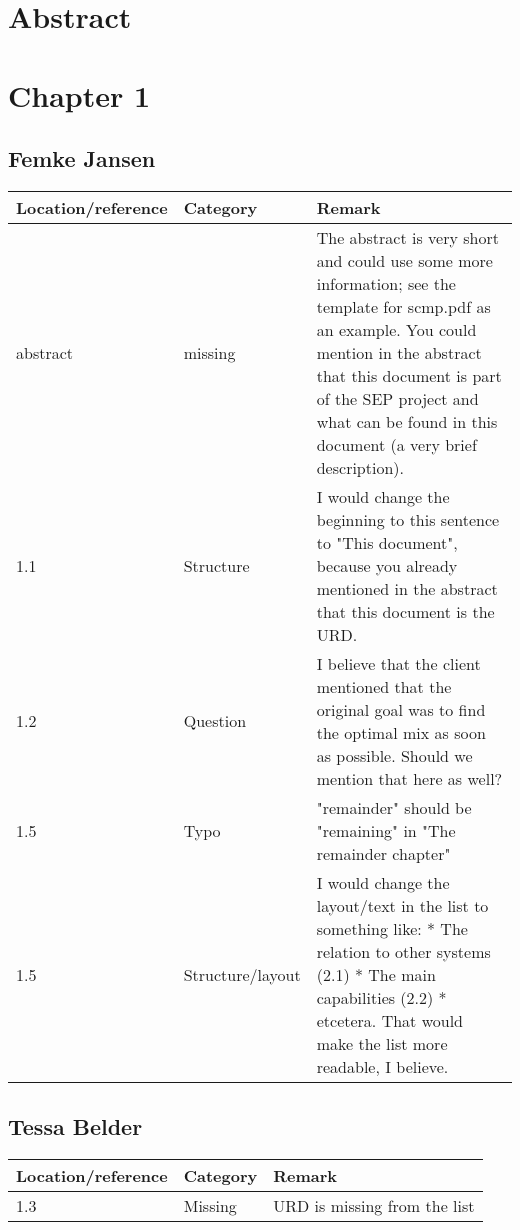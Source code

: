 
\section{Abstract}


\section{Chapter 1}

\subsection*{Femke Jansen}

\begin{tabular}{l|l|p{}}
Location/reference & Category & Remark\\
\hline
\hline
abstract & missing & The abstract is very short and could use some more information; see the template for scmp.pdf as an example. You could mention in the abstract that this document is part of the SEP project and what can be found in this document (a very brief description). \vspace{1em} \\
1.1 & Structure & I would change the beginning to this sentence to "This document", because you already mentioned in the abstract that this document is the URD.\vspace{1em} \\
1.2 & Question & I believe that the client mentioned that the original goal was to find the optimal mix as soon as possible. Should we mention that here as well? \vspace{1em} \\
1.5 & Typo & "remainder" should be "remaining" in "The remainder chapter"\\ 
1.5 & Structure/layout & I would change the layout/text in the list to something like:
* The relation to other systems (2.1)
* The main capabilities (2.2)
* etcetera.
That would make the list more readable, I believe.\\
\end{tabular}

\subsection*{Tessa Belder}

\begin{tabular}{l|l|p{}}
Location/reference & Category & Remark\\
\hline
\hline
1.3 & Missing & URD is missing from the list
\end{tabular}

